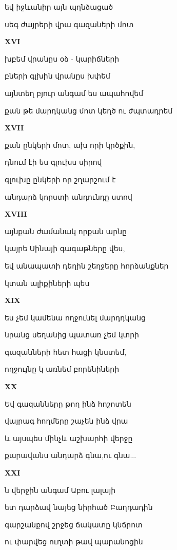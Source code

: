 եվ  իջևանիր այն պղնձացած 


սեգ ժայրերի վրա գազաների մոտ


\centerline{\bf XVI}

խբեմ վրանըս օձ - կարիճների



բների գլխին վրանըս խփեմ



այնտեղ բյուր անգամ ես ապահովեմ 


քան թե  մարդկանց մոտ կեղծ ու  ժպտադրեմ



\centerline    {\bf XVII} 

  քան ընկերի մոտ, ախ որի կրծքին,


դնում էի ես գլուխս սիրով


գլուխը ընկերի որ շղարշում է


անդարձ կորստի անդունդը ստով



\centerline{\bf XVIII}

 այնքան ժամանակ որքան արնը



 կայրե  Սինայի գագաթները վես,


եվ անապատի դեղին շեղջերը հորձանքներ 



կտան ալիքիների պես




\centerline {\bf    XIX}

     ես չեմ կամենա ողջունել մարդդկանց



  նրանց սեղանից պատառ չեմ կտրի 


  գազանների հետ հացի կնստեմ,

  
  ողջույնը կ առնեմ բորենիների


\centerline {\bf XX}

Եվ գազանները թող ինձ հոշոտեն


վայրագ հողմերը շաչեն ինձ վրա


 և այսպես մինչև աշխարհի վերջը



 քարավանս անդարձ գնա,ու գնա...



\centerline {\bf XXI}

ն վերջին անգամ Աբու լալայի


ետ դարձավ նայեց նիրհած Բաղդադին


գարշանքով շրջեց ճակատը կնճրոտ

ու փարվեց ուղտի թավ պարանոցին


